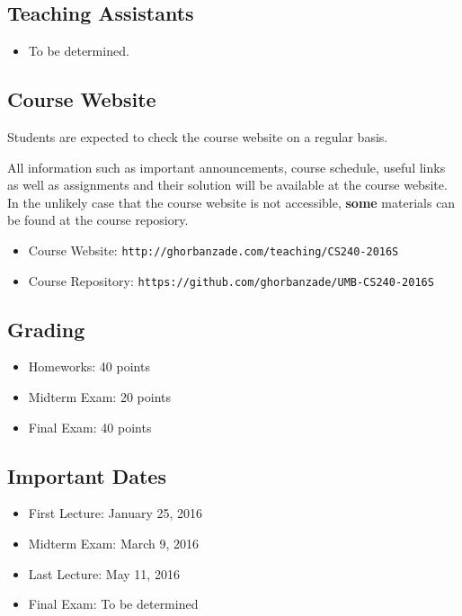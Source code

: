 \documentclass[12pt,letterpaper,twoside]{article}
\begin{document}
\subsection*{Teaching Assistants}
\begin{itemize}
\item[] To be determined.
\end{itemize}

\subsection*{Course Website}
Students are expected to check the course website on a regular basis.

All information such as important announcements, course schedule, useful links as well as assignments and their solution will be available at the course website.
In the unlikely case that the course website is not accessible, \textbf{some} materials can be found at the course reposiory.

\begin{itemize}
\item[] Course Website: \texttt{\footnotesize http://ghorbanzade.com/teaching/CS240-2016S}
\item[] Course Repository: \texttt{\footnotesize https://github.com/ghorbanzade/UMB-CS240-2016S}
\end{itemize}

\subsection*{Grading}
\begin{itemize}
\item[] Homeworks: 40 points
\item[] Midterm Exam: 20 points
\item[] Final Exam: 40 points
\end{itemize}

\subsection*{Important Dates}
\begin{itemize}
\item[] First Lecture: January 25, 2016
\item[] Midterm Exam: March 9, 2016
\item[] Last Lecture: May 11, 2016
\item[] Final Exam: To be determined
\end{itemize}
\end{document}
